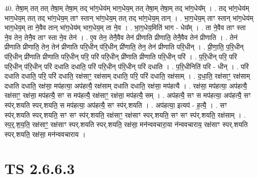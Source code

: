 \documentclass[17pt]{extarticle}
\begin{document}
40. तेषा॒म् तत् तत् तेषा॒म् तेषा॒म् तद् भा॑ग॒धेय॑म् भाग॒धेय॒म् तत् तेषा॒म् तेषा॒म् तद् भा॑ग॒धेय᳚म् । . तद् भा॑ग॒धेय॑म् भाग॒धेय॒म् तत् तद् भा॑ग॒धेय॒म् ताꣳ स्तान् भा॑ग॒धेय॒म् तत् तद् भा॑ग॒धेय॒म् तान् । . भा॒ग॒धेय॒म् ताꣳ स्तान् भा॑ग॒धेय॑म् भाग॒धेय॒म् ता ने॒वैव तान् भा॑ग॒धेय॑म् भाग॒धेय॒म् ता ने॒व । . भा॒ग॒धेय॒मिति॑ भाग - धेय᳚म् । . ता ने॒वैव ताꣳ स्ता ने॒व तेन॒ तेनै॒व ताꣳ स्ता ने॒व तेन॑ । . ए॒व तेन॒ तेनै॒वैव तेन॑ प्रीणाति प्रीणाति॒ तेनै॒वैव तेन॑ प्रीणाति । . तेन॑ प्रीणाति प्रीणाति॒ तेन॒ तेन॑ प्रीणाति परि॒धीन् प॑रि॒धीन् प्री॑णाति॒ तेन॒ तेन॑ प्रीणाति परि॒धीन् । . प्री॒णा॒ति॒ प॒रि॒धीन् प॑रि॒धीन् प्री॑णाति प्रीणाति परि॒धीन् परि॒ परि॑ परि॒धीन् प्री॑णाति प्रीणाति परि॒धीन् परि॑ । . प॒रि॒धीन् परि॒ परि॑ परि॒धीन् प॑रि॒धीन् परि॑ दधाति दधाति॒ परि॑ परि॒धीन् प॑रि॒धीन् परि॑ दधाति । . प॒रि॒धीनिति॑ परि - धीन् । . परि॑ दधाति दधाति॒ परि॒ परि॑ दधाति॒ रक्ष॑साꣳ॒॒ रक्ष॑साम् दधाति॒ परि॒ परि॑ दधाति॒ रक्ष॑साम् । . द॒धा॒ति॒ रक्ष॑साꣳ॒॒ रक्ष॑साम् दधाति दधाति॒ रक्ष॑सा॒ मप॑हत्या॒ अप॑हत्यै॒ रक्ष॑साम् दधाति दधाति॒ रक्ष॑सा॒ मप॑हत्यै । . रक्ष॑सा॒ मप॑हत्या॒ अप॑हत्यै॒ रक्ष॑साꣳ॒॒ रक्ष॑सा॒ मप॑हत्यै॒ सꣳ स मप॑हत्यै॒ रक्ष॑साꣳ॒॒ रक्ष॑सा॒ मप॑हत्यै॒ सम् । . अप॑हत्यै॒ सꣳ स मप॑हत्या॒ अप॑हत्यै॒ सꣳ स्प॑र्.शयति स्पर्.शयति॒ स मप॑हत्या॒ अप॑हत्यै॒ सꣳ स्प॑र्.शयति । . अप॑हत्या॒ इत्यप॑ - ह॒त्यै॒ । . सꣳ स्प॑र्.शयति स्पर्.शयति॒ सꣳ सꣳ स्प॑र्.शयति॒ रक्ष॑साꣳ॒॒ रक्ष॑साꣳ स्पर्.शयति॒ सꣳ सꣳ स्प॑र्.शयति॒ रक्ष॑साम् । . स्प॒र्॒.श॒य॒ति॒ रक्ष॑साꣳ॒॒ रक्ष॑साꣳ स्पर्.शयति स्पर्.शयति॒ रक्ष॑सा॒ मन॑न्ववचारा॒या न॑न्ववचाराय॒ रक्ष॑साꣳ स्पर्.शयति स्पर्.शयति॒ रक्ष॑सा॒ मन॑न्ववचाराय । \newline
\pagebreak
{}

\section{ TS 2.6.6.3 }
\end{document}
